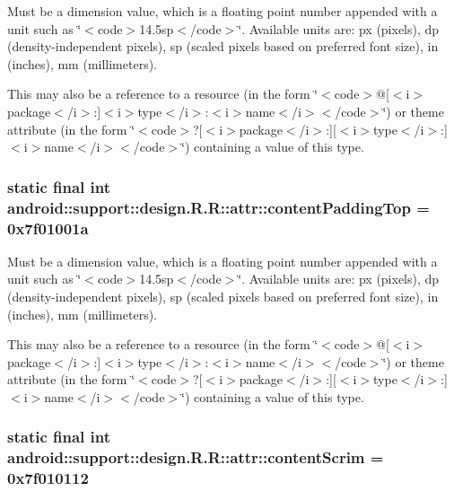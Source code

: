 Must be a dimension value, which is a floating point number appended with a unit such as \char`\"{}$<$code$>$14.5sp$<$/code$>$\char`\"{}. Available units are: px (pixels), dp (density-independent pixels), sp (scaled pixels based on preferred font size), in (inches), mm (millimeters). 

This may also be a reference to a resource (in the form \char`\"{}$<$code$>$@\mbox{[}$<$i$>$package$<$/i$>$:\mbox{]}$<$i$>$type$<$/i$>$:$<$i$>$name$<$/i$>$$<$/code$>$\char`\"{}) or theme attribute (in the form \char`\"{}$<$code$>$?\mbox{[}$<$i$>$package$<$/i$>$:\mbox{]}\mbox{[}$<$i$>$type$<$/i$>$:\mbox{]}$<$i$>$name$<$/i$>$$<$/code$>$\char`\"{}) containing a value of this type. \hypertarget{classandroid_1_1support_1_1design_1_1_r_1_1attr_b994052266fbb7286dcc26232d4f506b}{
\subsubsection[{contentPaddingTop}]{\setlength{\rightskip}{0pt plus 5cm}static final int android::support::design.R.R::attr::contentPaddingTop = 0x7f01001a}}
\label{classandroid_1_1support_1_1design_1_1_r_1_1attr_b994052266fbb7286dcc26232d4f506b}


Must be a dimension value, which is a floating point number appended with a unit such as \char`\"{}$<$code$>$14.5sp$<$/code$>$\char`\"{}. Available units are: px (pixels), dp (density-independent pixels), sp (scaled pixels based on preferred font size), in (inches), mm (millimeters). 

This may also be a reference to a resource (in the form \char`\"{}$<$code$>$@\mbox{[}$<$i$>$package$<$/i$>$:\mbox{]}$<$i$>$type$<$/i$>$:$<$i$>$name$<$/i$>$$<$/code$>$\char`\"{}) or theme attribute (in the form \char`\"{}$<$code$>$?\mbox{[}$<$i$>$package$<$/i$>$:\mbox{]}\mbox{[}$<$i$>$type$<$/i$>$:\mbox{]}$<$i$>$name$<$/i$>$$<$/code$>$\char`\"{}) containing a value of this type. \hypertarget{classandroid_1_1support_1_1design_1_1_r_1_1attr_837125caf5bbe6e97cb39cc1e5a22ce7}{
\subsubsection[{contentScrim}]{\setlength{\rightskip}{0pt plus 5cm}static final int android::support::design.R.R::attr::contentScrim = 0x7f010112}}
\label{classandroid_1_1support_1_1design_1_1_r_1_1attr_837125caf5bbe6e97cb39cc1e5a22ce7}



